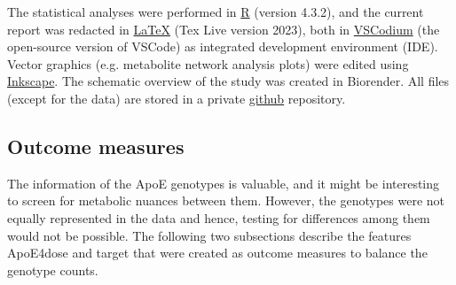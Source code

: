 \documentclass{amsart}
\begin{document}
The statistical analyses were performed in \href{https://www.r-project.org}{\textsf{R}} (version 4.3.2), and the current report was redacted in \href{https://ctan.org/tex}{\LaTeX}  (Tex Live version 2023), both in \href{https://vscodium.com}{\textsf{VSCodium}} (the open-source version of VSCode) as integrated development environment (IDE). Vector graphics (e.g. metabolite network analysis plots) were edited using \href{https://inkscape.org}{\textsf{Inkscape}}. The schematic overview of the study was created in Biorender. All files (except for the data) are stored in a private \href{https://github.com}{\textsf{github}} repository.

\subsection{Outcome measures}\label{featureeng}
The information of the ApoE genotypes is valuable, and it might be interesting to screen for metabolic nuances between them. However, the genotypes were not equally represented in the data and hence, testing for differences among them would not be possible. The following two subsections describe the features ApoE4dose and target that were created as outcome measures to balance the genotype counts.
\end{document}
